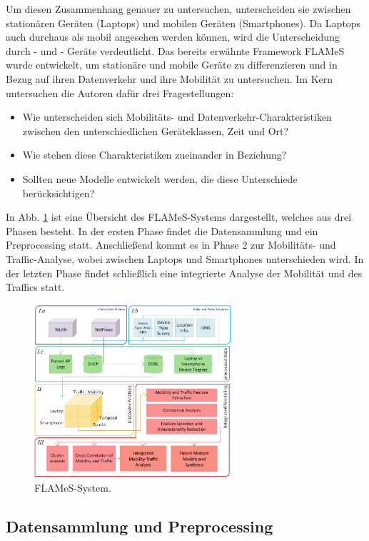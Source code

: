 \documentclass[12pt, a4paper]{article}
\begin{document}
Um diesen Zusammenhang genauer zu untersuchen, unterscheiden sie zwischen stationären Geräten (Laptops) und mobilen Geräten
(Smartphones). Da Laptops auch durchaus als mobil angesehen werden können, wird die Unterscheidung durch - und -
Geräte verdeutlicht. Das bereits erwähnte Framework FLAMeS wurde entwickelt, um stationäre und mobile Geräte zu differenzieren
und in Bezug auf ihren Datenverkehr und ihre Mobilität zu untersuchen.
Im Kern untersuchen die Autoren dafür drei Fragestellungen:
\begin{itemize}
    \item Wie unterscheiden sich Mobilitäts- und Datenverkehr-Charakteristiken zwischen den unterschiedlichen Geräteklassen,
    Zeit und Ort?
    \item Wie stehen diese Charakteristiken zueinander in Beziehung?
    \item Sollten neue Modelle entwickelt werden, die diese Unterschiede berücksichtigen?
\end{itemize}
\pagebreak
In Abb. \ref{fig:flames} ist eine Übersicht des FLAMeS-Systems dargestellt, welches aus drei Phasen besteht.
In der ersten Phase findet die Datensammlung und ein Preprocessing statt. Anschließend kommt es in Phase 2
zur Mobilitäts- und Traffic-Analyse, wobei zwischen Laptops und Smartphones unterschieden wird. In der letzten
Phase findet schließlich eine integrierte Analyse der Mobilität und des Traffics statt.
\begin{figure}[H]
\centering
\includegraphics[width=0.65\textwidth]{img/FLAMeS.png}
\caption{FLAMeS-System. \cite{Alipour2018}}
\label{fig:flames}
\end{figure}

\subsection{Datensammlung und Preprocessing}
\end{document}
